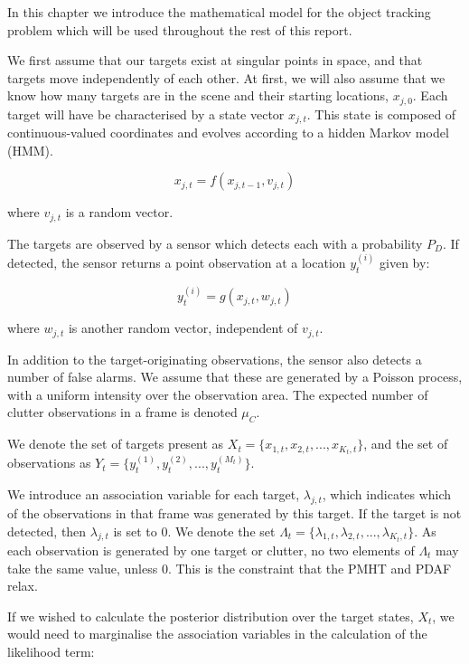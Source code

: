 In this chapter we introduce the mathematical model for the object tracking problem which will be used throughout the rest of this report.

We first assume that our targets exist at singular points in space, and that targets move independently of each other. At first, we will also assume that we know how many targets are in the scene and their starting locations, $x_{j,0}$. Each target will have be characterised by a state vector $x_{j,t}$. This state is composed of continuous-valued coordinates and evolves according to a hidden Markov model (HMM).

\begin{equation}
x_{j,t} = f(x_{j,t-1}, v_{j,t})
\end{equation}

where $v_{j,t}$ is a random vector.

The targets are observed by a sensor which detects each with a probability $P_D$. If detected, the sensor returns a point observation at a location $y_t^{(i)}$ given by:

\begin{equation}
y_t^{(i)} = g(x_{j,t}, w_{j,t})
\end{equation}

where $w_{j,t}$ is another random vector, independent of $v_{j,t}$.

In addition to the target-originating observations, the sensor also detects a number of false alarms. We assume that these are generated by a Poisson process, with a uniform intensity over the observation area. The expected number of clutter observations in a frame is denoted $\mu_C$.

We denote the set of targets present as $X_t = \{x_{1,t}, x_{2,t}, ... , x_{K_t, t} \}$, and the set of observations as $Y_t = \{y_t^{(1)}, y_t^{(2)}, ... , y_t^{(M_t)} \}$.

We introduce an association variable for each target, $\lambda_{j,t}$, which indicates which of the observations in that frame was generated by this target. If the target is not detected, then $\lambda_{j,t}$ is set to 0. We denote the set $\Lambda_t = \{\lambda_{1,t}, \lambda_{2,t}, ... , \lambda_{K_t, t} \}$. As each observation is generated by one target or clutter, no two elements of $\Lambda_t$ may take the same value, unless 0. This is the constraint that the PMHT and PDAF relax.

If we wished to calculate the posterior distribution over the target states, $X_t$, we would need to marginalise the association variables in the calculation of the likelihood term:

